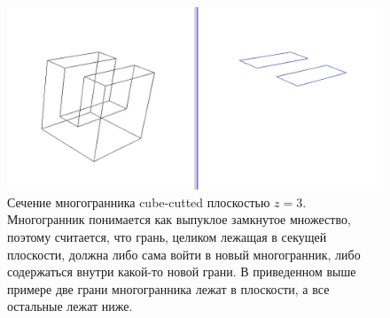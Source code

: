 \documentclass[a4paper,12pt, titlepage]{article}
\begin{document}
	\begin{flushleft}
		\begin{figure}[ht]
		    \includegraphics[width=15cm]{cube-cutted/cube-cutted-3.png}
		    \caption{Сечение многогранника cube-cutted плоскостью $z = 3$. Многогранник понимается как выпуклое
		замкнутое множество, поэтому считается, что грань, целиком лежащая в секущей плоскости,
		должна либо сама войти в новый многогранник, либо содержаться внутри какой-то новой грани.
		В приведенном выше примере две грани многогранника лежат в плоскости, а все остальные лежат
		ниже.}
		    \label{cube-cutted-3}
		\end{figure}
	\end{flushleft}

\newpage
\end{document}
